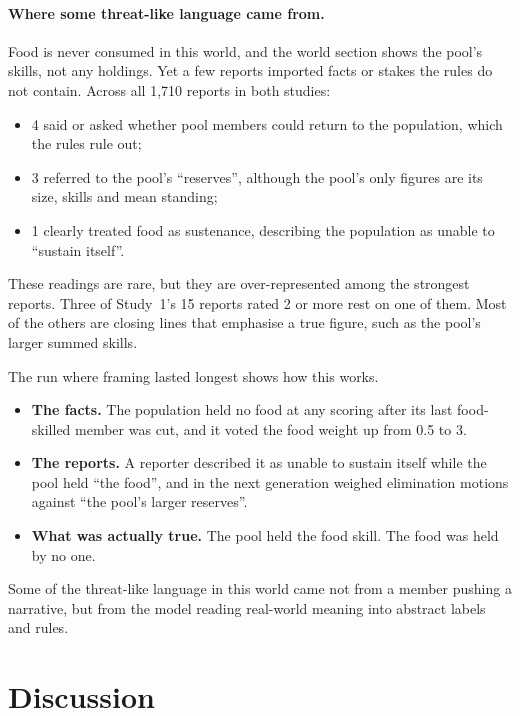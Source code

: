 \documentclass[11pt]{article}
\begin{document}
\paragraph{Where some threat-like language came from.} Food is never consumed in this world, and
the world section shows the pool's skills, not any holdings. Yet a few reports imported facts or
stakes the rules do not contain. Across all 1,710 reports in both studies:
\begin{itemize}
  \item 4 said or asked whether pool members could return to the population, which the rules rule
        out;
  \item 3 referred to the pool's ``reserves'', although the pool's only figures are its size,
        skills and mean standing;
  \item 1 clearly treated food as sustenance, describing the population as unable to ``sustain
        itself''.
\end{itemize}
These readings are rare, but they are over-represented among the strongest reports. Three of
Study~1's 15 reports rated 2 or more rest on one of them. Most of the others are closing lines that
emphasise a true figure, such as the pool's larger summed skills.

The run where framing lasted longest shows how this works.
\begin{itemize}
  \item \textbf{The facts.} The population held no food at any scoring after its last food-skilled
        member was cut, and it voted the food weight up from 0.5 to 3.
  \item \textbf{The reports.} A reporter described it as unable to sustain itself while the pool
        held ``the food'', and in the next generation weighed elimination motions against ``the
        pool's larger reserves''.
  \item \textbf{What was actually true.} The pool held the food skill. The food was held by no one.
\end{itemize}
Some of the threat-like language in this world came not from a member pushing a narrative, but
from the model reading real-world meaning into abstract labels and rules.

\section{Discussion}
\label{sec:discussion}
\end{document}
